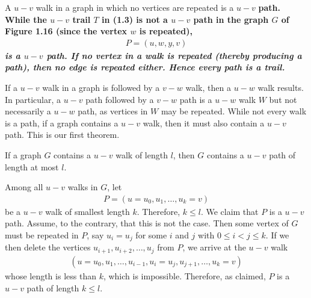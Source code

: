 A $u-v$ walk in a graph in which no vertices are repeated is a $u-v$ \bf{path}. While the $u-v$ trail $T$ in (1.3) is not a $u-v$ path in the graph $G$ of Figure 1.16 (since the vertex $w$ is repeated),
\begin{align*}
P = (u,w,y,v)
\end{align*}
\it{is} a $u-v$ path. If no vertex in a walk is repeated (thereby producing a path), then no edge is repeated either. Hence every path is a trail.

If a $u-v$ walk in a graph is followed by a $v-w$ walk, then a $u-w$ walk results. In particular, a $u-v$ path followed by a $v-w$ path is a $u-w$ walk $W$ but not necessarily a $u-w$ path, as vertices in $W$ may be repeated. While not every walk is a path, if a graph contains a $u-v$ walk, then it must also contain a $u-v$ path. This is our first theorem.

\begin{thm}
If a graph $G$ contains a $u-v$ walk of length $l$, then $G$ contains a $u-v$ path of length at most $l$.
\end{thm}

\begin{pf}
Among all $u-v$ walks in $G$, let
\begin{align*}
P = (u = u_{0},u_{1},\ldots,u_{k} = v)
\end{align*}
be a $u-v$ walk of smallest length $k$. Therefore, $k \leq l$. We claim that $P$ is a $u-v$ path. Assume, to the contrary, that this is not the case. Then some vertex of $G$ must be repeated in $P$, say $u_{i} = u_{j}$ for some $i$ and $j$ with $0 \leq i < j \leq k$. If we then delete the vertices $u_{i+1},u_{i+2},\ldots,u_{j}$ from $P$, we arrive at the $u-v$ walk
\begin{align*}
(u = u_{0},u_{1},\ldots,u_{i-1},u_{i} = u_{j},u_{j+1},\ldots,u_{k} = v)
\end{align*}
whose length is less than $k$, which is impossible. Therefore, as claimed, $P$ is a $u-v$ path of length $k \leq l$.
\end{pf}

